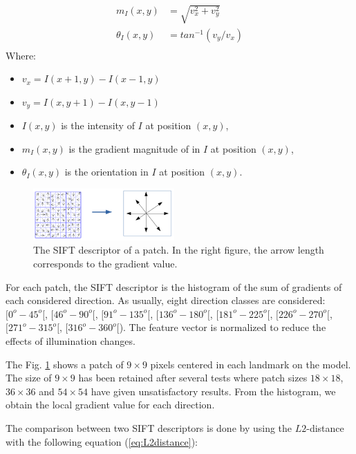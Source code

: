 \documentclass[twoside,twocolumn,10pt]{article}
\begin{document}
\begin{equation}
\label{eq:sift}
\begin{split}
	m_I(x,y) &= \sqrt{v_x^2 + v_y^2} \\
	\theta_I(x,y)& = tan^{-1}(v_y/v_x) \\
\end{split}
\end{equation}
Where:
\begin{itemize}[nosep,label=\footnotesize$\bullet$]
	\item $v_x = I(x+1,y) - I(x-1,y)$
	\item $v_y = I(x,y+1) - I(x,y-1)$
	\item $I(x,y)$ is the intensity of $I$ at position $(x,y)$,
	\item $m_I(x,y)$ is the gradient magnitude of in $I$ at position $(x,y)$,
	\item $\theta_I(x,y)$ is the orientation in $I$ at position $(x,y)$.
\end{itemize}

\begin{figure}[htbp]
    \centering
    \includegraphics[width=0.48\textwidth]{./images/keypoint_descriptor}
    \caption{
        The SIFT descriptor of a patch.
        In the right figure, the arrow length corresponds to the gradient value.
    }
    \label{fig:kpdescriptor}
\end{figure}

For each patch, the SIFT descriptor is the histogram of the sum of gradients of each considered direction.
As usually, eight direction classes are considered: $[0^o-45^o[$, $[46^o-90^o[$, $[91^o-135^o[$, $[136^o-180^o[$, $[181^o-225^o[$, $[226^o-270^o[$, $[271^o-315^o[$, $[316^o-360^o[$).
The feature vector is normalized to reduce the effects of illumination changes.

The Fig. \ref{fig:kpdescriptor} shows a patch of $9\times9$ pixels centered in each landmark on the model.
The size of $9\times9$ has been retained after several tests where patch sizes $18\times18$, $36\times36$ and $54\times54$ have given unsatisfactory results.
From the histogram, we obtain the local gradient value for each direction.

The comparison between two SIFT descriptors is done by using the $L2$-distance with the following equation (\ref{eq:L2distance}):
\end{document}
